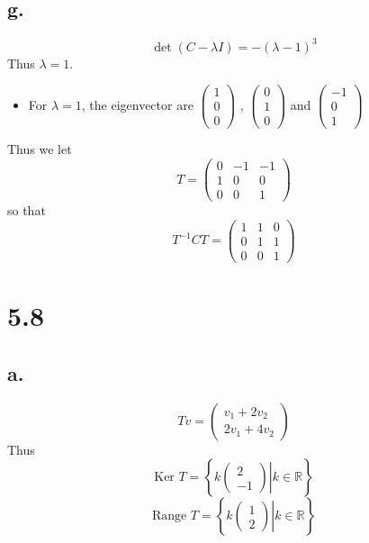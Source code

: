 \documentclass[11pt]{article}
\theoremstyle{mystyle}
\theoremstyle{definition}
\begin{document}
\subsection*{g.}
\[
  \det(C - \lambda I) = -(\lambda-1)^3
\]
Thus $\lambda =1$. 
\begin{itemize}
  \item For $\lambda = 1$, the eigenvector are 
    $\begin{pmatrix}
      1 \\ 0 \\ 0 
    \end{pmatrix}$
    ,
    $\begin{pmatrix}
    0 \\ 1 \\ 0 
    \end{pmatrix}$
    and 
    $\begin{pmatrix}
    -1 \\ 0 \\ 1 
    \end{pmatrix}$
\end{itemize}
Thus we let 
\[
  T = 
  \begin{pmatrix}
    0 & -1 & -1 \\
    1 & 0 & 0 \\
    0 & 0 & 1
  \end{pmatrix}
\]
so that 
\[
  T^{-1} C T = 
  \begin{pmatrix}
    1 & 1 & 0 \\
    0 & 1 & 1 \\
    0 & 0 & 1
  \end{pmatrix}
\]
\clearpage
\section*{5.8}
\subsection*{a.}
\[
  Tv = 
  \begin{pmatrix}
    v_1 + 2v_2 \\
    2v_1 + 4v_2
  \end{pmatrix}
\]
Thus 
\[
  \text{Ker } T = 
  \left\{
    \left. k
    \begin{pmatrix}
    2 \\
    -1
    \end{pmatrix}
    \right| k \in \mathbb{R}
    \right\}
\]
\[
  \text{Range } T = 
  \left\{
    \left. k
    \begin{pmatrix}
    1 \\
    2
    \end{pmatrix}
    \right| k \in \mathbb{R}
  \right\}
\]
\end{document}
